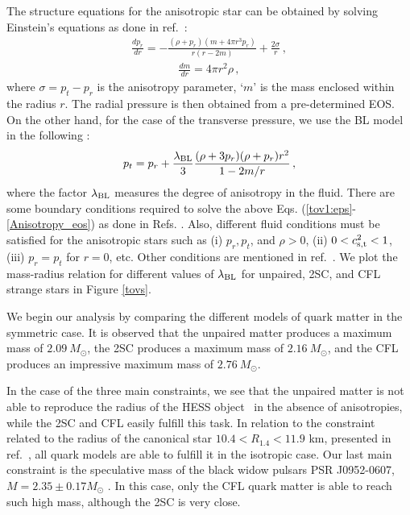 \documentclass[%
reprint,
superscriptaddress,
nofootinbib,
amsmath,
amssymb,
aps,
floatfix,
showkeys,
]{revtex4-2}
\begin{document}
The structure equations for the anisotropic star can be obtained by solving Einstein's equations as done in ref.~\cite{Doneva_2012}:
\begin{eqnarray}
    \frac{dp_r}{dr}=-\frac{\left( \rho + p_r \right)\left(m + 4\pi r^3 p_r \right)}{r\left(r -2m\right)} +\frac{2\sigma}{r} \,,
    \label{tov1:eps}
\end{eqnarray}
\begin{eqnarray}
    \frac{dm}{dr}=4\pi r^{2}\rho\,,
    \label{tov2:eps}
\end{eqnarray}
where $\sigma=p_t-p_r$ is the anisotropy parameter, `$m$' is the mass enclosed within the radius $r$. The radial pressure is then obtained from a pre-determined EOS.  On the other hand, for the case of the transverse pressure, we use the BL model in the following \cite{Bowers_1974}:
\begin{eqnarray}
    \label{Anisotropy_eos}
    p_t = p_r + \frac{\lambda_{\rm BL}}{3} \frac{(\rho+3p_r)(\rho + p_r)r^2}{1-2m/r} \,,
\end{eqnarray}
where the factor $\lambda_{\rm BL}$ measures the degree of anisotropy in the fluid. There are some boundary conditions required to solve the above Eqs. (\ref{tov1:eps}-\ref{Anisotropy_eos}) as done in Refs. \cite{Biswas_2019, Das_ILC_2022}. Also, different fluid conditions must be satisfied for the anisotropic stars such as (i) $p_r, p_t$, and $\rho > 0$, (ii) $0<c_{\rm s, t}^2<1$, (iii)  $p_r = p_t$ for $r =0$, etc. Other conditions are mentioned in ref.~\cite{Das_ILC_2022}. We plot the mass-radius relation for different values of $\lambda_{\rm BL}$ for unpaired, 2SC, and CFL strange stars in Figure \ref{tovs}.

We begin our analysis by comparing the different models of quark matter in the symmetric case.  It is observed that the unpaired matter produces a maximum mass of $2.09 \ M_\odot$,  the 2SC produces a maximum mass of $2.16 \ M_\odot$, and the CFL produces an impressive maximum mass of $2.76 \ M_\odot$.

In the case of the three main constraints, we see that the unpaired matter is not able to reproduce the radius of the HESS object~\cite{Doroshenko_2022} in the absence of anisotropies, while the 2SC and CFL easily fulfill this task. In relation to the constraint related to the radius of the canonical star $10.4<R_{1.4}<11.9$ km, presented in ref.~\cite{Capano_2020}, all quark models are able to fulfill it in the isotropic case. Our last main constraint is the speculative mass of the black widow pulsars PSR J0952-0607,  $M = 2.35\pm0.17 M_\odot$ \cite{Romani_2022}. In this case, only the CFL quark matter is able to reach such high mass, although the 2SC is very close. 
\end{document}
